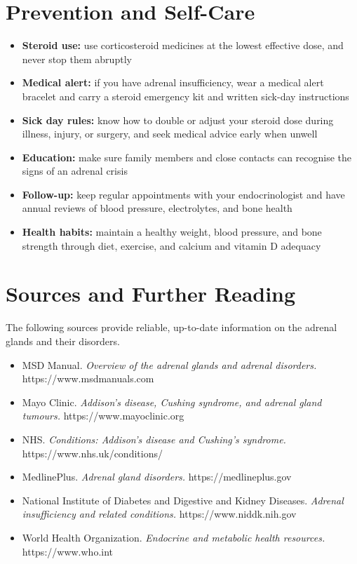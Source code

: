 \section*{Prevention and Self-Care}
\begin{itemize}
    \item \textbf{Steroid use:} use corticosteroid medicines at the lowest effective dose, and never stop them abruptly
    \item \textbf{Medical alert:} if you have adrenal insufficiency, wear a medical alert bracelet and carry a steroid emergency kit and written sick-day instructions
    \item \textbf{Sick day rules:} know how to double or adjust your steroid dose during illness, injury, or surgery, and seek medical advice early when unwell
    \item \textbf{Education:} make sure family members and close contacts can recognise the signs of an adrenal crisis
    \item \textbf{Follow-up:} keep regular appointments with your endocrinologist and have annual reviews of blood pressure, electrolytes, and bone health
    \item \textbf{Health habits:} maintain a healthy weight, blood pressure, and bone strength through diet, exercise, and calcium and vitamin D adequacy
\end{itemize}

\section*{Sources and Further Reading}
The following sources provide reliable, up-to-date information on the adrenal glands and their disorders.

\begin{itemize}
    \item MSD Manual. \textit{Overview of the adrenal glands and adrenal disorders.} https://www.msdmanuals.com
    \item Mayo Clinic. \textit{Addison's disease, Cushing syndrome, and adrenal gland tumours.} https://www.mayoclinic.org
    \item NHS. \textit{Conditions: Addison's disease and Cushing's syndrome.} https://www.nhs.uk/conditions/
    \item MedlinePlus. \textit{Adrenal gland disorders.} https://medlineplus.gov
    \item National Institute of Diabetes and Digestive and Kidney Diseases. \textit{Adrenal insufficiency and related conditions.} https://www.niddk.nih.gov
    \item World Health Organization. \textit{Endocrine and metabolic health resources.} https://www.who.int
\end{itemize}
